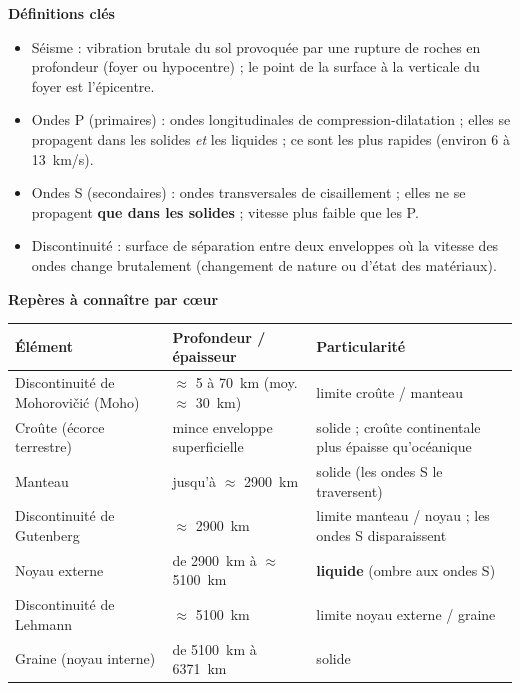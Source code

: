 \documentclass[11pt]{article}
\newcommand{\cle}[1]{{\popxbold\color{popdark}#1}}
\begin{document}
\begin{bilan}
\textbf{Définitions clés}
\begin{itemize}
  \item \cle{Séisme} : vibration brutale du sol provoquée par une rupture de roches en profondeur (foyer ou hypocentre) ; le point de la surface à la verticale du foyer est l'\cle{épicentre}.
  \item \cle{Ondes P} (primaires) : ondes longitudinales de compression-dilatation ; elles se propagent dans les solides \emph{et} les liquides ; ce sont les plus rapides (environ 6 à \SI{13}{km/s}).
  \item \cle{Ondes S} (secondaires) : ondes transversales de cisaillement ; elles ne se propagent \textbf{que dans les solides} ; vitesse plus faible que les P.
  \item \cle{Discontinuité} : surface de séparation entre deux enveloppes où la vitesse des ondes change brutalement (changement de nature ou d'état des matériaux).
\end{itemize}

\textbf{Repères à connaître par c\oe ur}
\begin{center}
\begin{tabularx}{\linewidth}{|l|X|X|}\hline
\rowcolor{popblueL} \textbf{Élément} & \textbf{Profondeur / épaisseur} & \textbf{Particularité} \\ \hline
Discontinuité de Mohorovičić (Moho) & $\approx$ 5 à \SI{70}{km} (moy. $\approx$ \SI{30}{km}) & limite croûte / manteau \\ \hline
Croûte (écorce terrestre) & mince enveloppe superficielle & solide ; croûte continentale plus épaisse qu'océanique \\ \hline
Manteau & jusqu'à $\approx$ \SI{2900}{km} & solide (les ondes S le traversent) \\ \hline
Discontinuité de Gutenberg & $\approx$ \SI{2900}{km} & limite manteau / noyau ; les ondes S disparaissent \\ \hline
Noyau externe & de \SI{2900}{km} à $\approx$ \SI{5100}{km} & \textbf{liquide} (ombre aux ondes S) \\ \hline
Discontinuité de Lehmann & $\approx$ \SI{5100}{km} & limite noyau externe / graine \\ \hline
Graine (noyau interne) & de \SI{5100}{km} à \SI{6371}{km} & solide \\ \hline
\end{tabularx}
\end{center}


\end{bilan}
\end{document}

